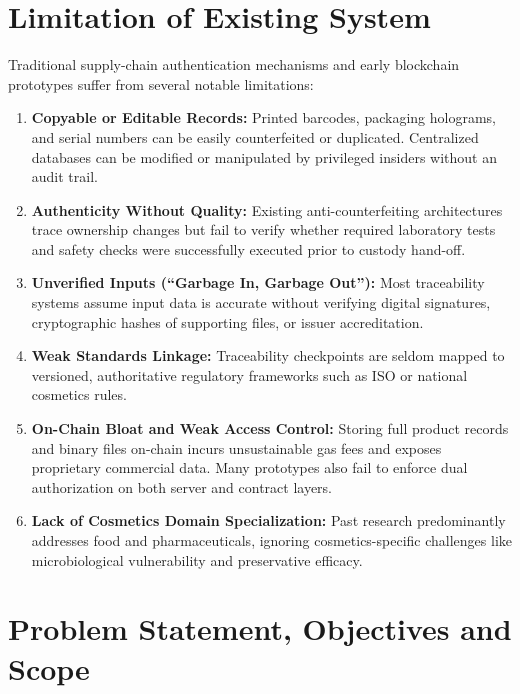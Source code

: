 \documentclass[12pt,a4paper]{report}
\begin{document}
\chapter{Limitation of Existing System}

Traditional supply-chain authentication mechanisms and early blockchain prototypes suffer from several notable limitations:

\begin{enumerate}[leftmargin=1.8em, itemsep=4pt, parsep=0pt]
    \item \textbf{Copyable or Editable Records:} Printed barcodes, packaging holograms, and serial numbers can be easily counterfeited or duplicated. Centralized databases can be modified or manipulated by privileged insiders without an audit trail.
    \item \textbf{Authenticity Without Quality:} Existing anti-counterfeiting architectures trace ownership changes but fail to verify whether required laboratory tests and safety checks were successfully executed prior to custody hand-off.
    \item \textbf{Unverified Inputs (``Garbage In, Garbage Out''):} Most traceability systems assume input data is accurate without verifying digital signatures, cryptographic hashes of supporting files, or issuer accreditation.
    \item \textbf{Weak Standards Linkage:} Traceability checkpoints are seldom mapped to versioned, authoritative regulatory frameworks such as ISO or national cosmetics rules.
    \item \textbf{On-Chain Bloat and Weak Access Control:} Storing full product records and binary files on-chain incurs unsustainable gas fees and exposes proprietary commercial data. Many prototypes also fail to enforce dual authorization on both server and contract layers.
    \item \textbf{Lack of Cosmetics Domain Specialization:} Past research predominantly addresses food and pharmaceuticals, ignoring cosmetics-specific challenges like microbiological vulnerability and preservative efficacy.
\end{enumerate}

\chapter{Problem Statement, Objectives and Scope}
\end{document}

